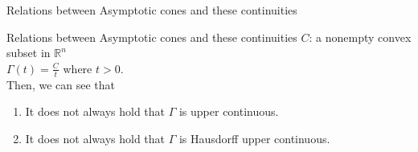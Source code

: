 \documentclass[aspectratio=169, dvipdfmx, 11pt]{beamer} %
\newcommand{\NDemenstionalRealEuclidianSpace}{\mathbb{R}^n}
\begin{document}
\begin{frame}[t]{Relations between Asymptotic cones and these continuities}
  \begin{block}{Relations between Asymptotic cones and these continuities}
    $C$: a nonempty convex subset in $\NDemenstionalRealEuclidianSpace$ \\
    $\Gamma (t) = \frac{C}{t}$ where $t > 0$. \\
    Then, we can see that
    \begin{enumerate}
      \item It does not always hold that $\Gamma$ is upper continuous.
      \item It does not always hold that $\Gamma$ is Hausdorff upper continuous.
    \end{enumerate}
  \end{block}


\end{frame}
\end{document}
